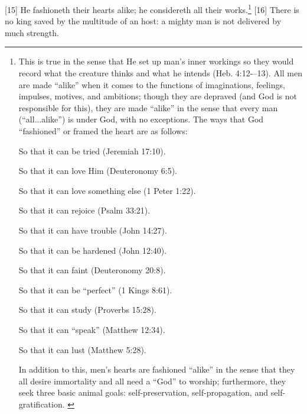 [15] \textcolor[rgb]{0.00,0.00,1.00}{He fashioneth their hearts alike; he considereth all their works.}\footnote{This is true in the sense that He set up man’s inner workings so they would record what the creature thinks and what he intends (Heb. 4:12-–13). All men are made “alike” when it comes to the functions of imaginations, feelings, impulses, motives, and ambitions; though they are depraved (and God is not responsible for this), they are made “alike” in the sense that every man (“all...alike”) is under God, with no exceptions. The ways that God “fashioned” or framed the heart are as follows:
\begin{compactenum}
\item So that it can be tried (Jeremiah 17:10).
\item So that it can love Him (Deuteronomy 6:5).
\item So that it can love something else (1 Peter 1:22).
\item So that it can rejoice (Psalm 33:21).
\item So that it can have trouble (John 14:27).
\item So that it can be hardened (John 12:40).
\item So that it can faint (Deuteronomy 20:8).
\item So that it can be ``perfect'' (1 Kings 8:61).
\item So that it can study (Proverbs 15:28).
\item So that it can ``speak'' (Matthew 12:34).
\item So that it can lust (Matthew 5:28).
\end{compactenum}
In addition to this, men’s hearts are fashioned ``alike'' in the sense that they all desire immortality and all need a ``God'' to worship; furthermore, they seek three basic animal goals: self-preservation, self-propagation, and self-gratification.  \cite{Ruckman1992Psalms} }
[16] \textcolor[rgb]{0.00,0.00,1.00}{There is no king saved by the multitude of an host: a mighty man is not delivered by much strength.}
